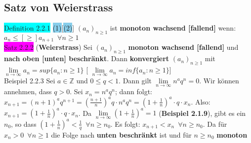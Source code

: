 \documentclass[landscape, 10pt]{article}
\begin{document}
\begin{multicols}{3}
       \subsection{Satz von Weierstrass}
              \colorbox{cyan}{Definition 2.2.1} 
                     \colorbox{SkyBlue}{(1)}[\colorbox{SkyBlue}{(2)}] 
                     $(a_n)_{n\geqslant 1}$ ist \textbf{monoton
                     wachsend [fallend]} wenn: \textcolor{NavyBlue}{
                     $a_n\leqslant[\geqslant]a_{n+1}\enspace\forall n\geqslant1$}\\
              \colorbox{magenta}{Satz 2.2.2} 
              (\textbf{Weierstrass}) 
                     Sei \textcolor{NavyBlue}{$(a_n)_{n\geqslant 1}$}
                     \textbf{monoton wachsend 
                     [fallend]} und \textbf{nach oben [unten] beschränkt}. Dann 
                     \textbf{konvergiert} 
                     \textcolor{NavyBlue}{$(a_n)_{n\geqslant 1}$} mit 
                     \textcolor{NavyBlue}{
                     $\lim\limits_{n\to\infty}a_n=sup\{a_n:n\geqslant 1\}$}
                     [\textcolor{NavyBlue}{
                     $\lim\limits_{n\to\infty}a_n=inf\{a_n:n\geqslant 1\}$}]\\
              \colorbox{Dandelion}{Beispiel 2.2.3} 
                     Sei \textcolor{NavyBlue}{$a\in\mathbb{Z}$} und 
                     \textcolor{NavyBlue}{$0\leqslant q<1$}.
                     Dann gilt 
                     \textcolor{NavyBlue}{$\lim\limits_{n\to\infty}n^aq^n=0$}.
                     Wir können annehmen, dass \textcolor{NavyBlue}{$q>0$}. Sei 
                     \textcolor{NavyBlue}{$x_n=n^aq^n$}; dann folgt:
                     \textcolor{NavyBlue}{
                     $x_{n+1}=(n+1)^aq^{n+1}=(\frac{n+1}{n})^aq\cdot n^aq^n
                     =(1+\frac{1}{n})^a\cdot q\cdot x_n$}. Also:
                     \textcolor{NavyBlue}{
                     $x_{n+1}=(1+\frac{1}{n})^a\cdot q\cdot x_n$}. 
                     Da \textcolor{NavyBlue}{$\lim\limits_{n\to\infty}(1+\frac{1}{n})^a=1$}
                     (\textbf{Beispiel 2.1.9}), gibt es ein \textcolor{NavyBlue}{$n_0$}, so dass
                     \textcolor{NavyBlue}{
                     $(1+\frac{1}{n})^a<\frac{1}{q}\enspace\forall n\geqslant n_0$}.
                     Es folgt: 
                     \textcolor{NavyBlue}{$x_{n+1}<x_n\enspace\forall n\geqslant n_0$}. 
                     Da für \textcolor{NavyBlue}{$x_n>0\enspace\forall n\geqslant1$} 
                     die Folge nach \textbf{unten beschränkt} ist und für 
                     \textcolor{NavyBlue}{$n\geqslant n_0$} \textbf{monoton
}
\end{multicols}
\end{document}
